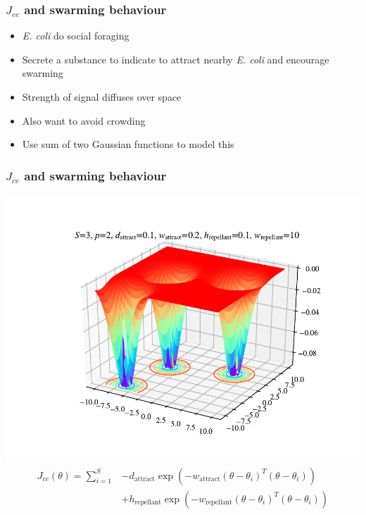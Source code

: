 \documentclass{beamer}
\begin{document}
\begin{frame}
\frametitle{$J_{cc}$ and swarming behaviour}
\begin{itemize}
  \item \textit{\textit{E. coli}} do social foraging
  \item Secrete a substance to indicate to attract nearby \textit{\textit{E. coli}} and encourage swarming
  \item Strength of signal diffuses over space
  \item Also want to avoid crowding
  \item Use sum of two Gaussian functions to model this
\end{itemize}
\end{frame}

\begin{frame}
\frametitle{$J_{cc}$ and swarming behaviour}
\begin{center}
\includegraphics[scale=0.4]{assets/swarming}
\begin{align*}
J_{cc}(\theta) = \sum_{i=1}^S &-d_\text{attract} \exp \left( -w_\text{attract} (\theta - \theta_i)^T (\theta - \theta_i) \right) \\ &+ h_\text{repellant} \exp \left( -w_\text{repellant} (\theta - \theta_i)^T (\theta - \theta_i) \right)
\end{align*}
\end{center}
\end{frame}
\end{document}
